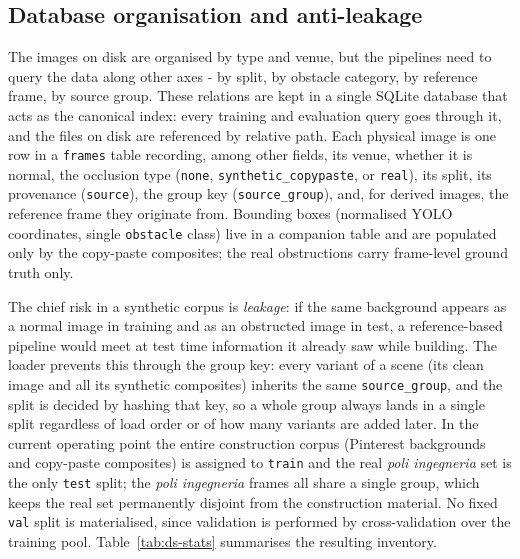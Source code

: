 \subsection{Database organisation and anti-leakage}
\label{ssec:ds-db}

The images on disk are organised by type and venue, but the pipelines need to
query the data along other axes - by split, by obstacle category, by reference
frame, by source group. These relations are kept in a single SQLite database that
acts as the canonical index: every training and evaluation query goes through it,
and the files on disk are referenced by relative path. Each physical image is one
row in a \texttt{frames} table recording, among other fields, its venue, whether
it is normal, the occlusion type (\texttt{none}, \texttt{synthetic\_copypaste}, or
\texttt{real}), its split, its provenance (\texttt{source}), the group key
(\texttt{source\_group}), and, for derived images, the reference frame they
originate from. Bounding boxes (normalised YOLO coordinates, single
\texttt{obstacle} class) live in a companion table and are populated only by the
copy-paste composites; the real obstructions carry frame-level ground truth only.

The chief risk in a synthetic corpus is \emph{leakage}: if the same background
appears as a normal image in training and as an obstructed image in test, a
reference-based pipeline would meet at test time information it already saw while
building. The loader prevents this through the group key: every variant of a
scene (its clean image and all its synthetic composites) inherits the same
\texttt{source\_group}, and the split is decided by hashing that key, so a whole
group always lands in a single split regardless of load order or of how many
variants are added later. In the current operating point the entire construction
corpus (Pinterest backgrounds and copy-paste composites) is assigned to
\texttt{train} and the real \emph{poli ingegneria} set is the only \texttt{test}
split; the
\emph{poli ingegneria} frames all share a single group, which keeps the real set
permanently disjoint from the construction material. No fixed \texttt{val} split
is materialised, since validation is performed by cross-validation over the
training pool. Table~\ref{tab:ds-stats} summarises the resulting inventory.

